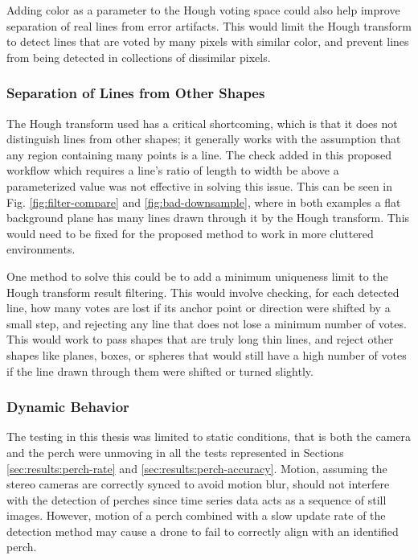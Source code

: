 Adding color as a parameter to the Hough voting space could also help improve separation of real lines
from error artifacts. This would limit the Hough transform to detect lines that are voted by many pixels
with similar color, and prevent lines from being detected in collections of dissimilar pixels. 

\subsubsection{Separation of Lines from Other Shapes}

The Hough transform used has a critical shortcoming, which is that it does not 
distinguish lines from other shapes; it generally works with the assumption that 
any region containing many points is a line. The check added in this proposed workflow which requires 
a line's ratio of length to width be above a parameterized value was not effective in solving this 
issue. This can be seen in Fig. \ref{fig:filter-compare}
and \ref{fig:bad-downsample}, where in both examples a flat background plane has many 
lines drawn through it by the Hough transform. This would need to be fixed for the proposed 
method to work in more cluttered environments.

One method to solve this could be to add a minimum uniqueness limit to the Hough transform 
result filtering. This would involve checking, for each detected line, how many votes are
lost if its anchor point or direction were shifted by a small step, and rejecting any line 
that does not lose a minimum number of votes. This would work to pass shapes that are truly 
long thin lines, and reject other shapes like planes, boxes, or spheres that would still 
have a high number of votes if the line drawn through them were shifted or turned slightly.

\subsubsection{Dynamic Behavior}

The testing in this thesis was limited to static conditions, that is both the camera and the perch 
were unmoving in all the tests represented in Sections \ref{sec:results:perch-rate} and \ref{sec:results:perch-accuracy}.
Motion, assuming the stereo cameras are correctly synced to avoid motion blur, 
should not interfere with the detection of perches since time series data acts as a sequence of still images. However,
motion of a perch combined with a slow update rate of the detection method may cause a drone to fail to correctly align 
with an identified perch.

